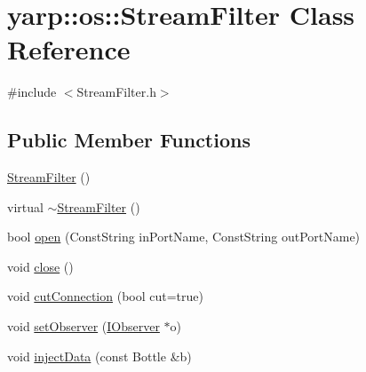 \hypertarget{classyarp_1_1os_1_1_stream_filter}{
\section{yarp::os::StreamFilter Class Reference}
\label{classyarp_1_1os_1_1_stream_filter}
}


{\ttfamily \#include $<$StreamFilter.h$>$}\subsection*{Public Member Functions}
\begin{DoxyCompactItemize}
\item 
\hyperlink{classyarp_1_1os_1_1_stream_filter_a687a3082652cb3163619fa04bfe9db1f}{StreamFilter} ()
\item 
virtual \hyperlink{classyarp_1_1os_1_1_stream_filter_a39cc5195a93b8146c2f9117298f97581}{$\sim$StreamFilter} ()
\item 
bool \hyperlink{classyarp_1_1os_1_1_stream_filter_aa2203de7321cabb2eb8e8a28b66cc470}{open} (ConstString inPortName, ConstString outPortName)
\item 
void \hyperlink{classyarp_1_1os_1_1_stream_filter_a833b30281a0c6039cdfcded6986fe36e}{close} ()
\item 
void \hyperlink{classyarp_1_1os_1_1_stream_filter_a3c72e672f88e6f9e8d77f7af8bcd31ee}{cutConnection} (bool cut=true)
\item 
void \hyperlink{classyarp_1_1os_1_1_stream_filter_a6f911f0b7818d212d58f05fe82c096a1}{setObserver} (\hyperlink{classyarp_1_1os_1_1_i_observer}{IObserver} $\ast$o)
\item 
void \hyperlink{classyarp_1_1os_1_1_stream_filter_a0dad0b2389fa998afc9336509569a01f}{injectData} (const Bottle \&b)
\end{DoxyCompactItemize}


